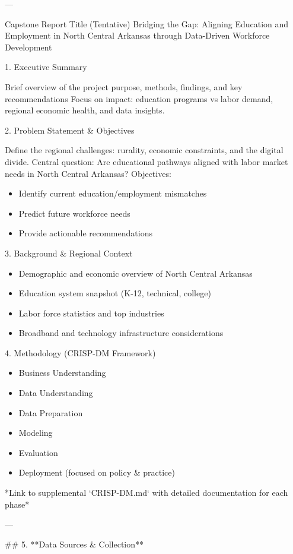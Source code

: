 
---

Capstone Report Title (Tentative)
Bridging the Gap: Aligning Education and Employment in North Central Arkansas through Data-Driven Workforce Development

1. Executive Summary

Brief overview of the project purpose, methods, findings, and key recommendations
Focus on impact: education programs vs labor demand, regional economic health, and data insights.

2. Problem Statement & Objectives

Define the regional challenges: rurality, economic constraints, and the digital divide.
Central question: Are educational pathways aligned with labor market needs in North Central Arkansas?
Objectives:
\begin{itemize}
    \item Identify current education/employment mismatches
    \item Predict future workforce needs
    \item Provide actionable recommendations
\end{itemize}

3. Background & Regional Context
\begin{itemize}
    \item Demographic and economic overview of North Central Arkansas
    \item Education system snapshot (K-12, technical, college)
    \item Labor force statistics and top industries
    \item Broadband and technology infrastructure considerations
\end{itemize}

4. Methodology (CRISP-DM Framework)
\begin{itemize}
    \item Business Understanding
    \item Data Understanding
    \item Data Preparation
    \item Modeling
    \item Evaluation
    \item Deployment (focused on policy & practice)
\end{itemize}
*Link to supplemental `CRISP-DM.md` with detailed documentation for each phase*

---

## 5. **Data Sources & Collection**

